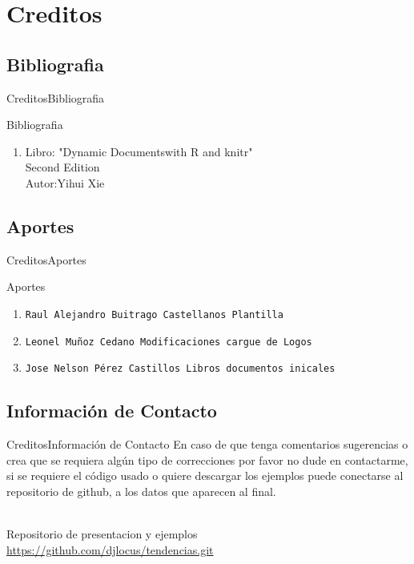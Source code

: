 \documentclass[10pt]{beamer}
\newcommand{\chref}[2]{%
  \href{#1}{{\usebeamercolor[bg]{AAUsidebar}#2}}%
}
\begin{document}

\section{Creditos }
\subsection{Bibliografia}

	

\begin{frame}{Creditos}{Bibliografia}
	\begin{block}{Bibliografia}
		\begin{enumerate}
			\item {Libro: "Dynamic Documentswith R and knitr"
				 \\Second Edition
				 \\Autor:Yihui Xie
				 }
		\end{enumerate}
	\end{block}
\end{frame}


\subsection{Aportes}
\begin{frame}{Creditos}{Aportes}
	\begin{block}{Aportes}
		\begin{enumerate}
			\item {\tt Raul Alejandro Buitrago Castellanos Plantilla}
			\item {\tt Leonel Muñoz Cedano Modificaciones cargue de Logos}
			\item {\tt Jose Nelson Pérez Castillos Libros documentos inicales }
		\end{enumerate}
	\end{block}
\end{frame}

\subsection{Información de Contacto}
\begin{frame}{Creditos}{Información de Contacto}
En caso de que tenga comentarios sugerencias o crea que se requiera algún tipo de correcciones por favor no dude en contactarme, si se requiere el código usado o quiere descargar los ejemplos puede conectarse al repositorio de github, a los datos que aparecen al final.
  \begin{center}
    \insertauthor\\
	Repositorio de presentacion y ejemplos\\
    \chref{https://github.com/djlocus/tendencias.git}{https://github.com/djlocus/tendencias.git}
    
  \end{center}
\end{frame}

{\aauwavesbg
\begin{frame}
\end{frame}}
\end{document}
